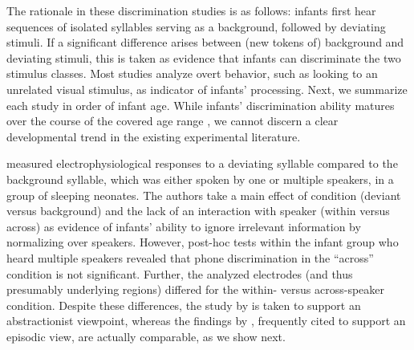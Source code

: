 \documentclass[10pt,letterpaper]{article}
\begin{document}
The rationale in these discrimination studies  is as follows: infants first hear sequences of isolated syllables serving as a background, followed by deviating stimuli. If a significant difference arises between (new tokens of) background and deviating stimuli, this is taken as evidence that infants can discriminate the two stimulus classes. Most studies analyze overt behavior, such as looking to an unrelated visual stimulus, as indicator of infants' processing. Next, we summarize each study in order of infant age. While infants' discrimination ability matures over the course of the covered age range \cite{InPhonDB}, we cannot discern a clear developmental trend in the existing experimental literature. 

  measured electrophysiological responses to a deviating syllable compared to the background syllable, which was either spoken by one or multiple speakers, in a group of sleeping neonates. The authors take a main effect of condition (deviant versus background) and the lack of an interaction with speaker (within versus across) as evidence of infants' ability to ignore irrelevant information by normalizing over speakers. However, post-hoc tests within the infant group who heard multiple speakers revealed that phone discrimination in the ``across'' condition is not significant. Further, the analyzed electrodes (and thus presumably underlying regions) differed for the within- versus across-speaker condition.  Despite these differences, the study by  is taken to support an abstractionist viewpoint, whereas the findings by , frequently cited to support an episodic view, are actually comparable, as we show next.
\end{document}
